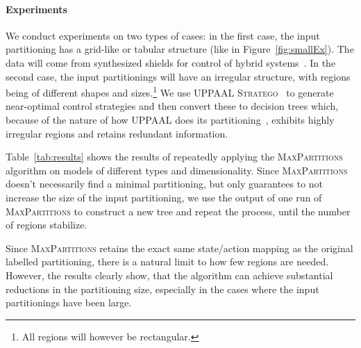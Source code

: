 \documentclass{easychair}
\begin{document}
\paragraph{Experiments} We conduct experiments on two types of cases: in the
first case, the input partitioning has a grid-like or tabular structure (like in
Figure~\ref{fig:smallEx}). The data will come from synthesized shields for
control of hybrid systems~\cite{brorholtShieldedReinforcementLearning2023}. In
the second case, the input partitionings will have an irregular structure, with
regions being of different shapes and sizes.\footnote{%
    All regions will however be rectangular.
} We use \textsc{UPPAAL Stratego}~\cite{davidUppaalStratego2015} to generate
near-optimal control strategies and then convert these to decision trees which,
because of the nature of how \textsc{UPPAAL} does its
partitioning~\cite{jaegerTeachingStrategoPlay2019}, exhibits highly irregular
regions and retains redundant information.

Table~\ref{tab:results} shows the results of repeatedly applying the
\textsc{MaxPartitions} algorithm on models of different types and
dimensionality. Since \textsc{MaxPartitions} doesn't necessarily find a minimal
partitioning, but only guarantees to not increase the size of the input
partitioning, we use the output of one run of \textsc{MaxPartitions} to
construct a new tree and repeat the process, until the number of regions
stabilize.

Since \textsc{MaxPartitions} retains the exact same state/action mapping as the
original labelled partitioning, there is a natural limit to how few regions are
needed. However, the results clearly show, that the algorithm can achieve
substantial reductions in the partitioning size, especially in the cases where
the input partitionings have been large. 
\end{document}
